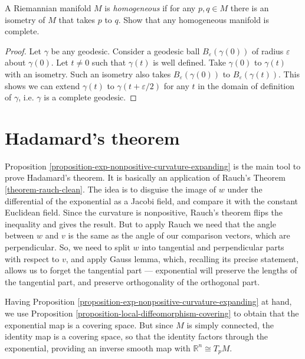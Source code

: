 \begin{exercise}
\label{exercise-homogeneous-manifold}
A Riemannian manifold $M$ is
{\it homogeneous} if for any $p,q \in M$
there is an isometry of $M$ that takes
$p$ to $q$. Show that any homogeneous
manifold is complete.
\end{exercise}

\begin{proof}
Let $\gamma$ be any geodesic. Consider
a geodesic ball $B_\varepsilon(\gamma(0))$
of radius $\varepsilon$
about $\gamma(0)$. Let $t \neq 0$
such that $\gamma(t)$ is well defined.
Take $\gamma(0)$ to $\gamma(t)$
with an isometry. Such an isometry
also takes $B_\varepsilon(\gamma(0))$
to $B_\varepsilon(\gamma(t))$.
This shows we can extend $\gamma(t)$
to $\gamma(t+\varepsilon/2)$
for any $t$ in the domain of definition
of $\gamma$, i.e. $\gamma$ is a complete
geodesic.
\end{proof}

\section{Hadamard's theorem}
\label{section-Hadamard}

\noindent
Proposition
\ref{proposition-exp-nonpositive-curvature-expanding}
is the main tool
to prove Hadamard's theorem. It
is basically an application
of Rauch's Theorem \ref{theorem-rauch-clean}.
The idea is to disguise the image
of $w$ under the differential of
the exponential as a Jacobi field,
and compare it with the constant Euclidean
field. Since the curvature is nonpositive,
Rauch's theorem flips the inequality
and gives the result. But to apply
Rauch we need that the angle between
$w$ and $v$ is the same as the angle
of our comparison vectors, which are
perpendicular. So, we need to split
$w$ into tangential and perpendicular
parts with respect to $v$, and apply
Gauss lemma, which, recalling its
precise statement, allows us to
forget the tangential part ---
exponential will preserve the
lengths of the tangential part,
and preserve orthogonality
of the orthogonal part.

Having 
Proposition
\ref{proposition-exp-nonpositive-curvature-expanding}
at hand, we use 
Proposition 
\ref{proposition-local-diffeomorphism-covering}
to obtain that the exponential map
is a covering space. But since $M$
is simply connected, the identity map
is a covering space, so that the
identity factors through the exponential,
providing an inverse smooth map
with $\mathbb{R}^n\cong T_pM$.

